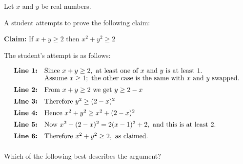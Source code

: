 \documentclass[11pt,a4paper]{article}
\begin{document}
\thispagestyle{djssolutions}
\djsFrontMatter
\clearpage
\thispagestyle{djssolutions}
\vspace*{8pt}
\begin{enumerate}[label=\textbf{\arabic*.},leftmargin=*,itemsep=0pt,start=1]

Let $x$ and $y$ be real numbers.

A student attempts to prove the following claim: \begin{center}
\begin{minipage}{0.82\linewidth}
\centering
\textbf{Claim:} If $x+y\geq2$ then $x^2+y^2\ge 2$
\end{minipage}
\end{center} The student's attempt is as follows:

\[
\begin{array}{@{}rl@{}}
\textbf{Line 1:} &
\text{Since }x+y\ge2,\text{ at least one of }x\text{ and }y\text{ is at least }1. \\[-1pt]
&
\text{Assume }x\ge1;\text{ the other case is the same with }x\text{ and }y\text{ swapped.} \\[5pt]

\textbf{Line 2:} &
\text{From }x+y\ge2\text{ we get }y\ge2-x \\[5pt]

\textbf{Line 3:} &
\text{Therefore }y^2\ge(2-x)^2 \\[5pt]

\textbf{Line 4:} &
\text{Hence }x^2+y^2\ge x^2+(2-x)^2 \\[5pt]

\textbf{Line 5:} &
\text{Now }x^2+(2-x)^2=2(x-1)^2+2,\text{ and this is at least }2. \\[5pt]

\textbf{Line 6:} &
\text{Therefore }x^2+y^2\ge2,\text{ as claimed.}\\[5pt]
\end{array}
\]


Which of the following best describes the argument?


\end{enumerate}
\end{document}
